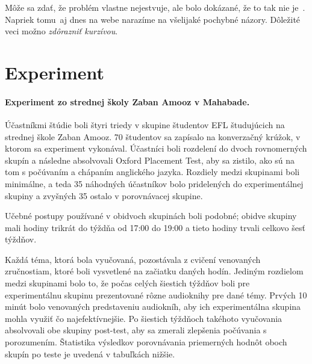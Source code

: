 \documentclass[10pt,oneside,slovak,a4paper]{article}
\begin{document}
Môže sa zdať, že problém vlastne nejestvuje\cite{Miangah2012}, ale bolo dokázané, že to tak nie je~\cite{KukulskaHulme2009}. Napriek tomu\, aj dnes na webe narazíme na všelijaké pochybné názory\cite{Kim2012}. Dôležité veci\cite{Azar2014} možno \emph{zdôrazniť kurzívou}.



\section{Experiment} \label{experiment}

\paragraph{Experiment zo strednej školy Zaban Amooz v Mahabade\cite{Azar2014}.} Účastníkmi štúdie boli štyri triedy v skupine študentov EFL študujúcich na strednej škole Zaban Amooz. 70 študentov sa zapísalo na konverzačný krúžok, v ktorom sa experiment vykonával. Účastníci boli rozdelení do dvoch rovnomerných skupín a následne absolvovali Oxford Placement Test, aby sa zistilo, ako sú na tom s počúvaním a chápaním anglického jazyka. Rozdiely medzi skupinami boli minimálne, a teda 35 náhodných účastníkov bolo pridelených do experimentálnej skupiny a zvyšných 35 ostalo v porovnávacej skupine.

Učebné postupy používané v obidvoch skupinách boli podobné; obidve skupiny mali hodiny trikrát do týždňa od 17:00 do 19:00 a tieto hodiny trvali celkovo šesť týždňov.

Každá téma, ktorá bola vyučovaná, pozostávala z cvičení venovaných zručnostiam, ktoré boli vysvetlené na začiatku daných hodín. Jediným rozdielom medzi skupinami bolo to, že počas celých šiestich týždňov boli pre experimentálnu skupinu prezentované rôzne audioknihy pre dané témy. Prvých 10 minút bolo venovaných predstaveniu audiokníh, aby ich experimentálna skupina mohla využiť čo najefektívnejšie. Po šiestich týždňoch takéhoto vyučovania absolvovali obe skupiny post-test, aby sa zmerali zlepšenia počúvania s porozumením. Štatistika výsledkov porovnávania priemerných hodnôt oboch skupín po teste je uvedená v tabuľkách nižšie.\\


\end{document}
